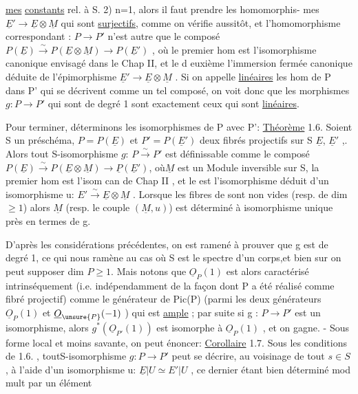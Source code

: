 
\uline{mes} \uline{constants} rel. à S. 2) n=1, alors il faut prendre les homomorphis-%
mes  $\underline{E}'\to \underline{E}\otimes\underline{M}$ qui sont \uline{surjectifs}, comme on vérifie
aussitôt, et l'homomorphisme correspondant : $P\to P'$ n'est autre que le
composé $P(\underline{E})\xrightarrow{\sim}P(\underline{E}\otimes\underline{M})\to P(\underline{E}')$ , où le premier hom est l'isomorphisme
canonique envisagé dans le Chap II, et le d euxième l'immersion fermée
canonique déduite de l'épimorphisme $\underline{E}'\to\underline{E}\otimes\underline{M}$ . Si on appelle \uline{linéaires}
les hom de P dans P' qui se décrivent comme un tel composé, on voit donc
que les morphismes $g:P\to P'$ qui sont de degré 1 sont exactement ceux qui
sont \uline{linéaires}.

Pour terminer, déterminons les isomorphismes de P avec P':
\uline{Théorème} 1.6. Soient S un préschéma, $P=P(\underline{E})$ et $P'=P(\underline{E}')$ deux fibrés
projectifs sur S $\underline{E}$, $\underline{E}'$ ,. Alors tout S-isomorphisme $g$: $P\xrightarrow{\sim}P'$ est définissable
comme le composé $P(\underline{E})\xrightarrow{\sim}P(\underline{E}\otimes\underline{M})\to \underline{P}(\underline{E}')$, où$\underline{M}$ est un Module inversible sur S, la premier hom est l'isom
can de Chap II , et le  est l'isomorphisme  déduit
d'un isomorphisme u: $E'\xrightarrow{\sim}\underline{E}\otimes\underline{M}$ . Lorsque les fibres de  sont non
vides (resp. de dim $\geq 1$) alors $\underline{M}$ (resp. le couple $(\underline{M},u)$) est déterminé
à isomorphisme unique près en termes de g.

D'après les considérations précédentes, on est ramené à prouver
que g est de degré 1, ce qui nous ramène au cas où S est le spectre d'un
corps,et bien sur on peut supposer dim $P\geq 1$. Mais notons que $\underline{O}_P(1)$ est alors caractérisé intrinséquement (i.e.
indépendamment de la façon dont P a été réalisé comme fibré projectif)
comme le générateur de Pic(P) (parmi les deux générateurs $\underline{O}_P(1)$ et
$\underline{O}_{\unsure{P}}(-1)$ ) qui est \uline{ample} ; par suite si g : $P\to P'$ est un isomorphisme,
alors $g^{*}(\underline{O}_{P'}(1))$ est isomorphe à $\underline{O}_P(1)$ , et on gagne. - Sous forme local
et moins savante, on peut énoncer:
\uline{Corollaire} 1.7. Sous les conditions de 1.6. , toutS-isomorphisme $g:P\to P'$
peut se décrire, au voisinage de tout $s\in S$, à l'aide d'un isomorphisme
u: $\underline{E}|U \simeq E'|U$ , ce dernier étant bien déterminé mod mult par un élément
